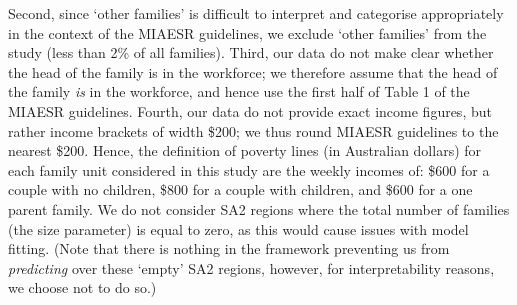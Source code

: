\documentclass[article]{jss}
\begin{document}
\begin{appendix}
Second, since `other families' is difficult to interpret and categorise appropriately in the context of the MIAESR guidelines, we exclude `other families' from the study (less than 2\% of all families). 
Third, our data do not make clear whether the head of the family is in the workforce; we therefore assume that the head of the family \textit{is} in the workforce, and hence use the first half of Table 1 of the MIAESR guidelines.
Fourth, our data do not provide exact income figures, but rather income brackets of width \$200; we thus round MIAESR guidelines to the nearest \$200. 
Hence, the definition of poverty lines (in Australian dollars) for each family unit considered in this study are the weekly incomes of: \$600 for a couple with no children, \$800 for a couple with children, and \$600 for a one parent family. 
We do not consider SA2 regions where the total number of families (the size parameter) is equal to zero, as this would cause issues with model fitting.
(Note that there is nothing in the framework preventing us from \textit{predicting} over these `empty' SA2 regions, however, for interpretability reasons, we choose not to do so.)



\end{appendix}
\end{document}
